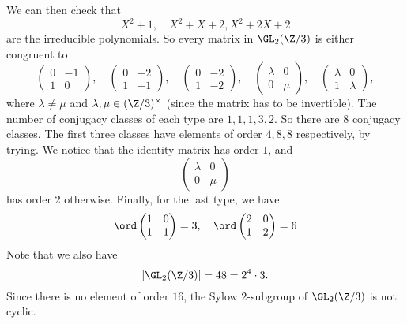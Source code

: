 \documentclass[a4paper]{article}
\begin{document}
\begin{eg}
  We can then check that
  \[
    X^2 + 1,\quad X^2 + X + 2, X^2 + 2X + 2
  \]
  are the irreducible polynomials. So every matrix in $\GL_2(\Z/3)$ is either congruent to
  \[
    \begin{pmatrix}
      0 & -1\\
      1 & 0
    \end{pmatrix},\quad
    \begin{pmatrix}
      0 & -2\\
      1 & -1
    \end{pmatrix},\quad
    \begin{pmatrix}
      0 & -2\\
      1 & -2
    \end{pmatrix},\quad
    \begin{pmatrix}
      \lambda & 0\\
      0 & \mu
    \end{pmatrix},\quad
    \begin{pmatrix}
      \lambda & 0\\
      1 & \lambda
    \end{pmatrix},
  \]
  where $\lambda \not= \mu$ and $\lambda, \mu \in (\Z/3)^\times$ (since the matrix has to be invertible). The number of conjugacy classes of each type are $1, 1, 1, 3, 2$. So there are 8 conjugacy classes. The first three classes have elements of order $4, 8, 8$ respectively, by trying. We notice that the identity matrix has order $1$, and
  \[
    \begin{pmatrix}
      \lambda & 0\\
      0 & \mu
    \end{pmatrix}
  \]
  has order $2$ otherwise. Finally, for the last type, we have
  \[
    \ord
    \begin{pmatrix}
      1 & 0\\
      1 & 1
    \end{pmatrix} = 3,\quad \ord
    \begin{pmatrix}
      2 & 0\\
      1 & 2
    \end{pmatrix} = 6
  \]
  Note that we also have
  \[
    |\GL_2(\Z/3)| = 48 = 2^4 \cdot 3.
  \]
  Since there is no element of order $16$, the Sylow $2$-subgroup of $\GL_2(\Z/3)$ is not cyclic.


\end{eg}
\end{document}
